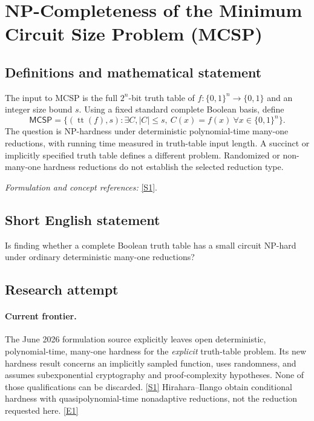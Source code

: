\documentclass[11pt,a4paper]{article}
\newcommand{\sref}[2]{\hyperlink{source:#1:#2}{[S#2]}}
\newcommand{\eref}[2]{\hyperlink{extra:#1:#2}{[E#2]}}
\newif\ifshowcatalogue
\newcommand{\cataloguescope}[1]{\ifshowcatalogue
 \paragraph{Exact scope in the supplied catalogue.}
 \begin{quote}\small #1\end{quote}\fi}
\numberwithin{equation}{section}
\begin{document}
\setcounter{section}{0}
\clearpage
\section*{\texorpdfstring{NP-Completeness of the Minimum Circuit Size Problem (MCSP)}{NP-Completeness of the Minimum Circuit Size Problem (MCSP)}}\label{statement}
\subsection{Definitions and mathematical statement}
The input to MCSP is the full $2^n$-bit truth table of $f:\{0,1\}^n\to\{0,1\}$ and an integer size bound $s$. Using a fixed standard complete Boolean basis, define
\[
 \mathsf{MCSP}=\{(\operatorname{tt}(f),s):\exists C,
                          |C|\le s,\ C(x)=f(x)\ \forall x\in\{0,1\}^n\}.
\]
The question is NP-hardness under deterministic polynomial-time many-one reductions, with running time measured in truth-table input length. A succinct or implicitly specified truth table defines a different problem. Randomized or non-many-one hardness reductions do not establish the selected reduction type.
\par\smallskip\textit{Formulation and concept references:} \sref{statement}{1}.
\cataloguescope{Prove or disprove that MCSP is NP-hard under deterministic polynomial-time many-one reductions, where an input is the truth table of a Boolean function and a size bound and asks whether a circuit of at most that size computes the function.}
\subsection{Short English statement}
Is finding whether a complete Boolean truth table has a small circuit NP-hard under ordinary deterministic many-one reductions?
\subsection{Research attempt}

\paragraph{Current frontier.}
The June 2026 formulation source explicitly leaves open deterministic,
polynomial-time, many-one hardness for the \emph{explicit} truth-table
problem. Its new hardness result concerns an implicitly sampled function,
uses randomness, and assumes subexponential cryptography and proof-complexity
hypotheses. None of those qualifications can be discarded.
\sref{statement}{1} Hirahara--Ilango obtain conditional hardness with
quasipolynomial-time nonadaptive reductions, not the reduction requested
here. \eref{statement}{1}
\end{document}
